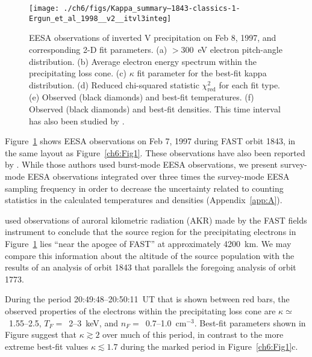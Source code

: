   \begin{figure}
    \centering
    \noindent\texttt{[image: ./ch6/figs/Kappa\_summary--1843-classics-1-Ergun\_et\_al\_1998\_\_v2\_\_itvl3integ]}
    \caption[Inverted V precipitation and best-fit Maxwellian and kappa
    distribution parameters (Orbit 1843)]{EESA observations of inverted V
      precipitation on Feb 8, 1997, and corresponding 2-D fit parameters. (a)
      $>$300~eV electron pitch-angle distribution. (b) Average electron energy spectrum
      within the precipitating loss cone. (c) $\kappa$ fit parameter for the
      best-fit kappa distribution. (d) Reduced chi-squared statistic
      $\chi^2_{\mathrm{red}}$ for each fit type. (e) Observed (black diamonds)
      and best-fit temperatures. (f) Observed (black diamonds) and best-fit
      densities. This time interval has also been studied by
      \citet{Ergun1998a,Ergun1998}.}
    \label{ch6:Fig4}
  \end{figure}


  Figure~\ref{ch6:Fig4} shows EESA observations on Feb 7, 1997 during FAST orbit
  1843, in the same layout as Figure~\ref{ch6:Fig1}. These observations have
  also been reported by \citet{Ergun1998a,Ergun1998}. While those authors used
  burst-mode EESA observations, we present survey-mode EESA observations
  integrated over three times the survey-mode EESA sampling frequency in order
  to decrease the uncertainty related to counting statistics in the calculated
  temperatures and densities (Appendix~\ref{app:A}).

  \citet{Ergun1998} used observations of auroral kilometric radiation (AKR) made
  by the FAST fields instrument \citep{Ergun2001} to conclude that the source
  region for the precipitating electrons in Figure~\ref{ch6:Fig4} lies ``near
  the apogee of FAST'' at approximately 4200~km. We may compare this information
  about the altitude of the source population with the results of an analysis of
  orbit 1843 that parallels the foregoing analysis of orbit 1773.

  During the period 20:49:48--20:50:11~UT that is shown between red bars, the
  observed properties of the electrons within the precipitating loss cone are
  $\kappa \simeq $~1.55--2.5, $T_F =$~2--3~keV, and $n_F =$~0.7--1.0~cm$^{-3}$.
  Best-fit parameters shown in Figure suggest that $\kappa \gtrsim 2$ over much of this period,
  in contrast to the more extreme best-fit values $\kappa \lesssim 1.7$ during
  the marked period in Figure~\ref{ch6:Fig1}c.


